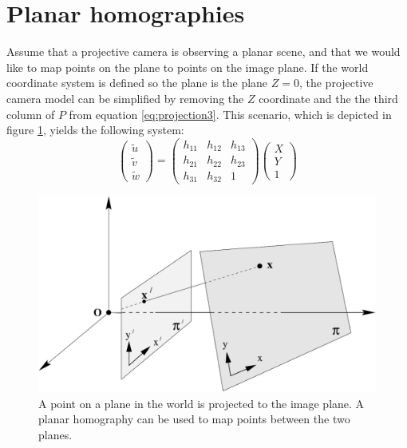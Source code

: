 \section{Planar homographies}\label{planar-homographies}
Assume that a projective camera is observing a planar scene, and that we would like to map points on the plane to points on the image plane. 
If the world coordinate system is defined so the plane is the plane $Z=0$, the projective camera model can be simplified by removing the $Z$ coordinate and the the third column of $P$ from equation \ref{eq:projection3}. 
This scenario, which is depicted in figure \ref{fig:planar_homography}, yields the following system:
\begin{equation}\label{eq:homography}
\begin{pmatrix} \tilde{u} \\ \tilde{v} \\ \tilde{w} \end{pmatrix} =
\begin{pmatrix} h_{11} & h_{12} & h_{13}  \\
 				h_{21} & h_{22} & h_{23}  \\
				h_{31} & h_{32} & 1\end{pmatrix}
\begin{pmatrix}X \\Y \\ 1\end{pmatrix}
\end{equation}

\begin{figure}
\begin{center}
\includegraphics[width=1.0\textwidth]{figures/planar_homography.pdf}
\end{center}
\caption{A point on a plane in the world is projected to the image plane. A planar homography can be used to map points between the two planes.} %
\label{fig:planar_homography}
\end{figure}

